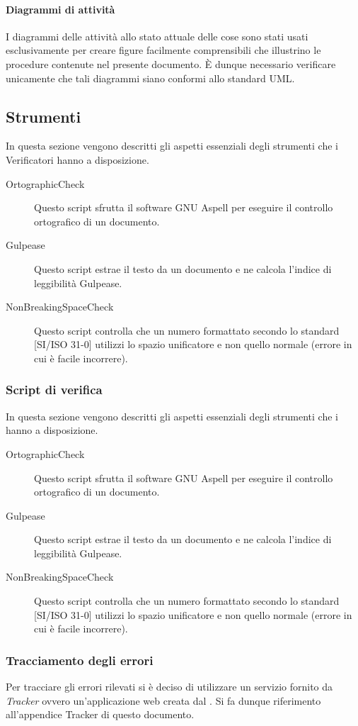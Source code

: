 			\paragraph{Diagrammi di attività}
				I diagrammi delle attività allo stato attuale delle cose sono stati usati esclusivamente per creare figure facilmente comprensibili che illustrino le procedure contenute nel presente documento. È dunque necessario verificare unicamente che tali diagrammi siano conformi allo standard UML.
	\subsection{Strumenti}
		In questa sezione vengono descritti gli aspetti essenziali degli strumenti che i Verificatori hanno a disposizione.
		\begin{description}
			\item[OrtographicCheck] Questo script sfrutta il software GNU Aspell per eseguire il controllo ortografico di un documento.
			\item[Gulpease] Questo script estrae il testo da un documento e ne calcola l'indice di leggibilità Gulpease.
			\item[NonBreakingSpaceCheck] Questo script controlla che un numero formattato secondo lo standard [SI/ISO 31-0] utilizzi lo spazio unificatore e non quello normale (errore in cui è facile incorrere).
		\end{description}
		\subsubsection{Script di verifica}
			In questa sezione vengono descritti gli aspetti essenziali degli strumenti che i  hanno a disposizione.
			\begin{description}
				\item[OrtographicCheck] Questo script sfrutta il software GNU Aspell per eseguire il controllo ortografico di un documento.
				\item[Gulpease] Questo script estrae il testo da un documento e ne calcola l'indice di leggibilità Gulpease.
				\item[NonBreakingSpaceCheck] Questo script controlla che un numero formattato secondo lo standard [SI/ISO 31-0] utilizzi lo spazio unificatore e non quello normale (errore in cui è facile incorrere).
			\end{description}
		\subsubsection{Tracciamento degli errori}
			Per tracciare gli errori rilevati si è deciso di utilizzare un servizio fornito da \textit{Tracker} ovvero un'applicazione web creata dal \groupname. Si fa dunque riferimento all'appendice Tracker di questo documento.
